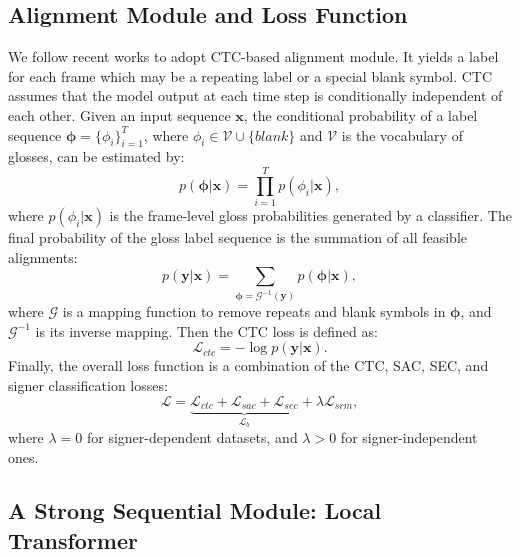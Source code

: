 \documentclass[acmsmall,screen]{acmart}
\def \mbf{\mathbf}
\begin{document}
\subsection{Alignment Module and Loss Function}
We follow recent works \cite{self-mutual, vac, stmc, cma} to adopt CTC-based alignment module.
It yields a label for each frame which may be a repeating label or a special blank symbol.
CTC assumes that the model output at each time step is conditionally independent of each other.
Given an input sequence $\mbf{x}$, the conditional probability of a label sequence $\boldsymbol{\phi}=\{\phi_i\}_{i=1}^T$, where $\phi_i \in \mathcal{V}\cup\{blank\}$ and $\mathcal{V}$ is the vocabulary of glosses, can be estimated by:
\begin{equation}
    p(\boldsymbol{\phi}|\mbf{x}) = \prod_{i=1}^T p(\phi_i|\mbf{x}),
\label{equ:ctc}
\end{equation}
where $p(\phi_i|\mbf{x})$ is the frame-level gloss probabilities generated by a classifier.
The final probability of the gloss label sequence is the summation of all feasible alignments:
\begin{equation}
    p(\mbf{y}|\mbf{x}) = \sum_{\boldsymbol{\phi}=\mathcal{G}^{-1}(\mbf{y})} p(\boldsymbol{\phi}|\mbf{x}),
\end{equation}
where $\mathcal{G}$ is a mapping function to remove repeats and blank symbols in $\boldsymbol{\phi}$, and $\mathcal{G}^{-1}$ is its inverse mapping.
Then the CTC loss is defined as:
\begin{equation}
    \mathcal{L}_{ctc} = -\log p(\mbf{y}|\mbf{x}).
\end{equation}
Finally, the overall loss function is a combination of the CTC, SAC, SEC, and signer classification losses:
\begin{equation}
\label{equ:overall_loss}
    \mathcal{L}=\underbrace{\mathcal{L}_{ctc}+\mathcal{L}_{sac}+\mathcal{L}_{sec}}_{\mathcal{L}_b}+\lambda\mathcal{L}_{srm},
\end{equation}
where $\lambda=0$ for signer-dependent datasets, and $\lambda>0$ for signer-independent ones.


\subsection{A Strong Sequential Module: Local Transformer}
\label{sec:lt}
\end{document}
